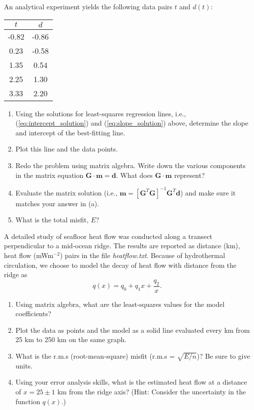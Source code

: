 \begin{problem}
An analytical experiment yields the following data pairs $t$ and $d(t)$:
\begin{table}[H]
\centering
\begin{tabular}{|c|c|} \hline
$t$ & $d$ \\ \hline
-0.82 & -0.86 \\ \hline
0.23 & -0.58 \\ \hline
1.35 & 0.54 \\ \hline
2.25 & 1.30 \\ \hline
3.33 & 2.20 \\ \hline
\end{tabular}
\end{table}
\begin{enumerate}[label=\alph*)]
\item Using the solutions for least-squares regression lines, i.e., (\ref{eq:intercept_solution}) and (\ref{eq:slope_solution})
above, determine the slope and intercept of the best-fitting line.
\item Plot this line and the data points.
\item Redo the problem using matrix algebra.  Write down the various components in the matrix equation
$\mathbf{G \cdot m = d}$.  What does $\mathbf{G \cdot m}$ represent?
\item Evaluate the matrix solution (i.e., $\mathbf{m} = [ \mathbf{G}^T\mathbf{G} ]^{-1}\mathbf{G}^T\mathbf{d}$)
and make sure it matches your answer in (a).
\item What is the total misfit, $E$?
\end{enumerate}
\end{problem}

\begin{problem}
A detailed study of seafloor heat flow was conducted along a transect perpendicular
to a mid-ocean ridge.  The results are reported as distance (km), heat flow (mWm$^{-2}$) pairs in
the file \emph{heatflow.txt}.  Because of hydrothermal circulation, we choose to model the
decay of heat flow with distance from the ridge as
\[
q(x) = q_0 + q_1x + \frac{q_2}{x}.
\]
\begin{enumerate}[label=\alph*)]
\item Using matrix algebra, what are the least-squares values for the model coefficients?
\item Plot the data as points and the model as a solid line evaluated every km from 25 km to 250 km
on the same graph.
\item What is the r.m.s (root-mean-square) misfit (r.m.s = $\sqrt{E/n}$)? Be sure to give units.
\item Using your error analysis skills, what is the estimated
heat flow at a distance of $x = 25 \pm 1$ km from the ridge axis? (Hint: Consider the uncertainty
in the function $q(x)$.)
\end{enumerate}
\end{problem}

